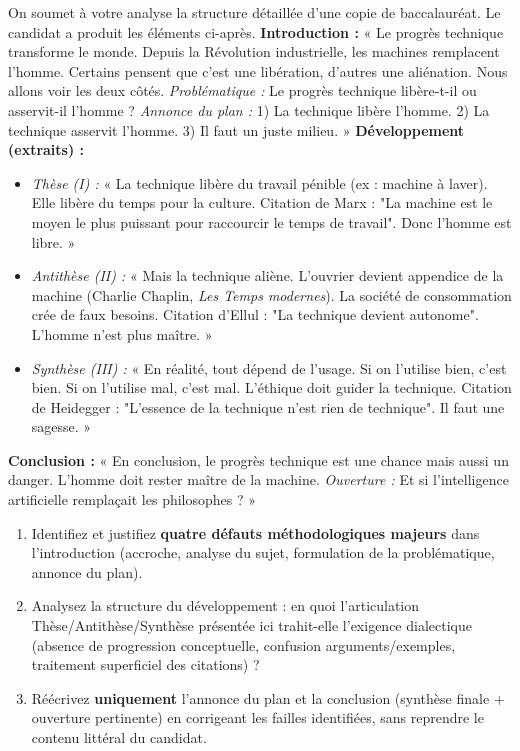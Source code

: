 \documentclass[11pt]{article}
\begin{document}
\begin{exercice}
On soumet à votre analyse la structure détaillée d'une copie de baccalauréat. Le candidat a produit les éléments ci-après.
\textbf{Introduction :} « Le progrès technique transforme le monde. Depuis la Révolution industrielle, les machines remplacent l'homme. Certains pensent que c'est une libération, d'autres une aliénation. Nous allons voir les deux côtés. \textit{Problématique :} Le progrès technique libère-t-il ou asservit-il l'homme ? \textit{Annonce du plan :} 1) La technique libère l'homme. 2) La technique asservit l'homme. 3) Il faut un juste milieu. »
\textbf{Développement (extraits) :}
\begin{itemize}
    \item \textit{Thèse (I) :} « La technique libère du travail pénible (ex : machine à laver). Elle libère du temps pour la culture. Citation de Marx : "La machine est le moyen le plus puissant pour raccourcir le temps de travail". Donc l'homme est libre. »
    \item \textit{Antithèse (II) :} « Mais la technique aliène. L'ouvrier devient appendice de la machine (Charlie Chaplin, \textit{Les Temps modernes}). La société de consommation crée de faux besoins. Citation d'Ellul : "La technique devient autonome". L'homme n'est plus maître. »
    \item \textit{Synthèse (III) :} « En réalité, tout dépend de l'usage. Si on l'utilise bien, c'est bien. Si on l'utilise mal, c'est mal. L'éthique doit guider la technique. Citation de Heidegger : "L'essence de la technique n'est rien de technique". Il faut une sagesse. »
\end{itemize}
\textbf{Conclusion :} « En conclusion, le progrès technique est une chance mais aussi un danger. L'homme doit rester maître de la machine. \textit{Ouverture :} Et si l'intelligence artificielle remplaçait les philosophes ? »
\begin{enumerate}
    \item Identifiez et justifiez \textbf{quatre défauts méthodologiques majeurs} dans l'introduction (accroche, analyse du sujet, formulation de la problématique, annonce du plan).
    \item Analysez la structure du développement : en quoi l'articulation Thèse/Antithèse/Synthèse présentée ici trahit-elle l'exigence dialectique (absence de progression conceptuelle, confusion arguments/exemples, traitement superficiel des citations) ?
    \item Réécrivez \textbf{uniquement} l'annonce du plan et la conclusion (synthèse finale + ouverture pertinente) en corrigeant les failles identifiées, sans reprendre le contenu littéral du candidat.
\end{enumerate}
\end{exercice}
\end{document}
